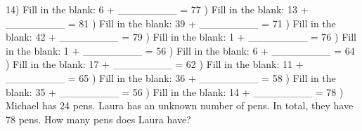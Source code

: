 \documentclass{article}%
\begin{document}
14) Fill in the blank: 6 + \_\_\_\_\_\_\_\_ = 77%
\newline%
\newline%
) Fill in the blank: 13 + \_\_\_\_\_\_\_\_ = 81%
\newline%
\newline%
) Fill in the blank: 39 + \_\_\_\_\_\_\_\_ = 71%
\newline%
\newline%
) Fill in the blank: 42 + \_\_\_\_\_\_\_\_ = 79%
\newline%
\newline%
) Fill in the blank: 1 + \_\_\_\_\_\_\_\_ = 76%
\newline%
\newline%
) Fill in the blank: 1 + \_\_\_\_\_\_\_\_ = 56%
\newline%
\newline%
) Fill in the blank: 6 + \_\_\_\_\_\_\_\_ = 64%
\newline%
\newline%
) Fill in the blank: 17 + \_\_\_\_\_\_\_\_ = 62%
\newline%
\newline%
) Fill in the blank: 11 + \_\_\_\_\_\_\_\_ = 65%
\newline%
\newline%
) Fill in the blank: 36 + \_\_\_\_\_\_\_\_ = 58%
\newline%
\newline%
) Fill in the blank: 35 + \_\_\_\_\_\_\_\_ = 56%
\newline%
\newline%
) Fill in the blank: 14 + \_\_\_\_\_\_\_\_ = 78%
\newline%
\newline%
) Michael has 24 pens. Laura has an unknown number of pens. In total, they have 78 pens. How many pens does Laura have?%
\newline%
\newline%
\end{document}
